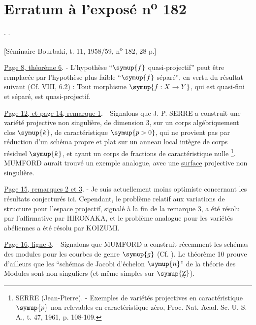 \clearpage
\chapter*{Erratum à l'exposé n\textsuperscript{o} 182}
\setcounter{footnote}{1}

. .

\begin{center}
[Séminaire Bourbaki, t. 11, 1958/59, n\textsuperscript{o} 182, 28 p.]
\end{center}

\noindent\uline{Page 8, théorème 6}. - L'hypothèse ``$\symup{f}$
quasi-projectif'' peut être remplacée par l'hypothèse plus faible ``$\symup{f}$
séparé'', en vertu du résultat suivant (Cf.  VIII, 6.2) : Tout morphisme
$\symup{f:X\to Y}$, qui est quasi-fini et séparé, est quasi-projectif.

\begingroup
\makeatletter
\renewcommand\@makefnmark{\hbox{\normalfont(\textsuperscript{\@thefnmark})}}
\makeatother
\noindent\uline{Page 12, et page 14, remarque 1}. - Signalons que J.-P.
SERRE a construit une variété projective non singulière, de dimension 3, sur
un corps algébriquement clos $\symup{k}$, de caractéristique $\symup{p>0}$, qui ne provient pas
par réduction d'un schéma propre et plat sur un anneau local intègre de corps résiduel
$\symup{k}$, et ayant un corps de fractions de caractéristique
nulle \footnote[2]{SERRE (Jean-Pierre). - Exemples de variétés projectives en
caractéristique $\symup{p}$ non relevables en caractéristique zéro, Proc. Nat.
Acad. Sc. U. S. A., t. 47, 1961, p. 108-109.}. MUMFORD aurait trouvé un exemple
analogue, avec une \uline{surface} projective non singulière.

\noindent\uline{Page 15, remarques 2 et 3}. - Je suis actuellement moins
optimiste concernant les résultats conjecturés ici. Cependant, le problème
relatif aux variations de structure pour l'espace projectif, signalé à la fin
de la remarque 3, a été résolu par l'affirmative par HIRONAKA, et le problème
analogue pour les variétés abéliennes a été résolu par KOIZUMI.

\noindent\uline{Page 16, ligne 3}. - Signalons que MUMFORD a construit
récemment les schémas des modules pour les courbes de genre $\symup{g}$ (Cf. ). Le
théorème 10 prouve d'ailleurs que les ``schémas de Jacobi d'échelon $\symup{n}$'' de la
théorie des Modules sont non singuliers (et même simples sur $\symup{\text{\uwave{Z}}}$).

